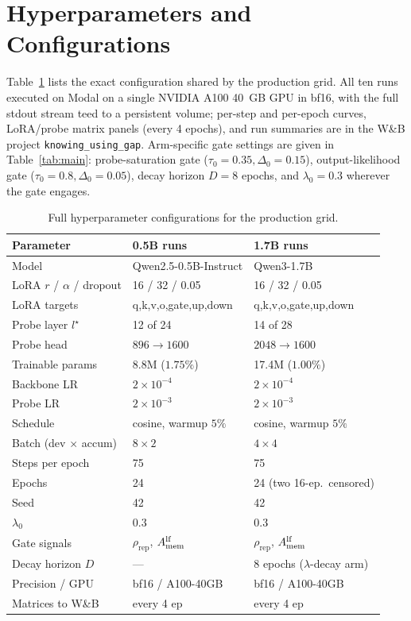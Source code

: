 \section{Hyperparameters and Configurations}
\label{app:hyper}

Table~\ref{tab:hyper} lists the exact configuration shared by the
production grid. All ten runs executed on Modal on a single NVIDIA
A100 40~GB GPU in bf16, with the full stdout stream teed to a
persistent volume; per-step and per-epoch curves, LoRA/probe matrix
panels (every 4 epochs), and run summaries are in the W\&B project
\texttt{knowing\_using\_gap}. Arm-specific gate settings are given in
Table~\ref{tab:main}: probe-saturation gate
($\tau_0{=}0.35,\Delta_0{=}0.15$), output-likelihood gate
($\tau_0{=}0.8,\Delta_0{=}0.05$), decay horizon $D{=}8$ epochs, and
$\lambda_0{=}0.3$ wherever the gate engages.

\begin{table}[h]
\centering
\small
\begin{tabular*}{\columnwidth}{@{\extracolsep{\fill}} l l l}
\toprule
Parameter & 0.5B runs & 1.7B runs \\
\midrule
Model & Qwen2.5-0.5B-Instruct & Qwen3-1.7B \\
LoRA $r$ / $\alpha$ / dropout & 16 / 32 / 0.05 & 16 / 32 / 0.05 \\
LoRA targets & q,k,v,o,gate,up,down & q,k,v,o,gate,up,down \\
Probe layer $l^\star$ & 12 of 24 & 14 of 28 \\
Probe head & $896 \to 1600$ & $2048 \to 1600$ \\
Trainable params & 8.8M ($1.75\%$) & 17.4M ($1.00\%$) \\
Backbone LR & $2{\times}10^{-4}$ & $2{\times}10^{-4}$ \\
Probe LR & $2{\times}10^{-3}$ & $2{\times}10^{-3}$ \\
Schedule & cosine, warmup $5\%$ & cosine, warmup $5\%$ \\
Batch (dev $\times$ accum) & $8 \times 2$ & $4 \times 4$ \\
Steps per epoch & 75 & 75 \\
Epochs & 24 & 24 (two 16-ep.\ censored) \\
Seed & 42 & 42 \\
$\lambda_0$ & 0.3 & 0.3 \\
Gate signals & $\rho_{\mathrm{rep}}$, $A_{\mathrm{mem}}^{\mathrm{lf}}$ & $\rho_{\mathrm{rep}}$, $A_{\mathrm{mem}}^{\mathrm{lf}}$ \\
Decay horizon $D$ & --- & 8 epochs ($\lambda$-decay arm) \\
Precision / GPU & bf16 / A100-40GB & bf16 / A100-40GB \\
Matrices to W\&B & every 4 ep & every 4 ep \\
\bottomrule
\end{tabular*}
\caption{Full hyperparameter configurations for the production grid.}
\label{tab:hyper}
\end{table}


